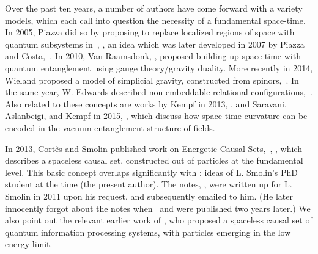 \documentclass[letterpaper,12pt,titlepage,oneside,final]{book}
\begin{document}
Over the past ten years, a number of authors have come forward with a variety models, which each call into question the necessity of a fundamental space-time.  In 2005, Piazza  did so by proposing to replace localized regions of space with quantum subsystems in~\cite{fedoglim}, \cite{fedo}, an idea which was later developed in 2007 by Piazza and Costa,~\cite{costapiazza}.  In 2010, Van Raamsdonk, \cite{raam},  proposed building up space-time with quantum entanglement using gauge theory/gravity duality.
More recently in 2014, Wieland proposed a model of simplicial gravity, constructed from spinors,~\cite{Wolfgang}.  In the same year, W. Edwards described non-embeddable relational configurations,~\cite{bill}.  Also related to these concepts are works by Kempf in 2013, \cite{achim},   and  Saravani, Aslanbeigi, and Kempf in 2015,  \cite{sak}, which discuss how space-time curvature can be encoded in the vacuum entanglement structure of fields.




In 2013, Cort\^{e}s and Smolin published work on Energetic Causal Sets,~\cite{QECS}, \cite{Universe}, which describes a spaceless causal set, constructed out of particles at the fundamental level.  This basic concept overlaps significantly with \cite{cmnotes}:  ideas of L. Smolin's PhD student at the time (the present author).  The notes, \cite{cmnotes}, were written up for L. Smolin in 2011 upon his request, and subsequently emailed to him.   (He later innocently forgot about the notes when~\cite{QECS} and \cite{Universe} were published two years later.)  We also point out the relevant earlier work of \cite{km}, who proposed a spaceless causal set of quantum information processing systems, with particles emerging in the low energy limit.
\end{document}
